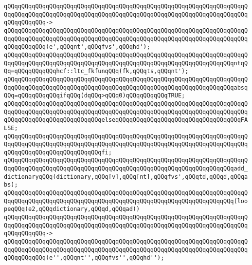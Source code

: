 \verb|qQQqqQQqqQQqqQQqqQQqqQQqqQQqqQQqqQQqqQQqqQQqqQQqqQQqqQQqqQQqqQQqqQQqqQQqqQQqqQQqqQQqqQQqqQQqqQQqqQQqqQQqqQQqqQQqqQQqqQQqqQQqqQQqqQQqqQQqqQQqqQQqqQQqqQQq->|\newline
\verb|qQQqqQQqqQQqqQQqqQQqqQQqqQQqqQQqqQQqqQQqqQQqqQQqqQQqqQQqqQQqqQQqqQQqqQQqqQQqqQQqqQQqqQQqqQQqqQQqqQQqqQQqqQQqqQQqqQQqqQQqqQQqqQQqqQQqqQQqqQQqqQQqqQQqqQQq(e',qQQqnt',qQQqfvs',qQQqhd');|\newline
\newline
\verb|qQQqqQQqqQQqqQQqqQQqqQQqqQQqqQQqqQQqqQQqqQQqqQQqqQQqqQQqqQQqqQQqqQQqqQQqqQQqqQQqqQQqqQQqqQQqqQQqqQQqqQQqqQQqqQQqqQQqqQQqqQQqqQQqqQQqqQQqntqQQq=qQQqqQQqqQQqhcf::ltc_fkfunqQQq(fk,qQQqts,qQQqnt');|\newline
\newline
\verb|qQQqqQQqqQQqqQQqqQQqqQQqqQQqqQQqqQQqqQQqqQQqqQQqqQQqqQQqqQQqqQQqqQQqqQQqqQQqqQQqqQQqqQQqqQQqqQQqqQQqqQQqqQQqqQQqqQQqqQQqqQQqqQQqqQQqqQQqabsqQQq=qQQqqQQqqQQqifqQQq(dqQQq>qQQq0)qQQqqQQqqQQqTRUE;|\newline
\verb|qQQqqQQqqQQqqQQqqQQqqQQqqQQqqQQqqQQqqQQqqQQqqQQqqQQqqQQqqQQqqQQqqQQqqQQqqQQqqQQqqQQqqQQqqQQqqQQqqQQqqQQqqQQqqQQqqQQqqQQqqQQqqQQqqQQqqQQqqQQqqQQqqQQqqQQqqQQqqQQqqQQqqQQqelseqQQqqQQqqQQqqQQqqQQqqQQqqQQqqQQqqQQqFALSE;|\newline
\verb|qQQqqQQqqQQqqQQqqQQqqQQqqQQqqQQqqQQqqQQqqQQqqQQqqQQqqQQqqQQqqQQqqQQqqQQqqQQqqQQqqQQqqQQqqQQqqQQqqQQqqQQqqQQqqQQqqQQqqQQqqQQqqQQqqQQqqQQqqQQqqQQqqQQqqQQqqQQqqQQqqQQqqQQqfi;|\newline
\newline
\verb|qQQqqQQqqQQqqQQqqQQqqQQqqQQqqQQqqQQqqQQqqQQqqQQqqQQqqQQqqQQqqQQqqQQqqQQqqQQqqQQqqQQqqQQqqQQqqQQqqQQqqQQqqQQqqQQqqQQqqQQqqQQqqQQqqQQqqQQqadd_dictionaryqQQq(dictionary,qQQq[v],qQQq[nt],qQQqfvs',qQQqtd,qQQqd,qQQqabs);|\newline
\newline
\verb|qQQqqQQqqQQqqQQqqQQqqQQqqQQqqQQqqQQqqQQqqQQqqQQqqQQqqQQqqQQqqQQqqQQqqQQqqQQqqQQqqQQqqQQqqQQqqQQqqQQqqQQqqQQqqQQqqQQqqQQqqQQqqQQqqQQqqQQq(loopeqQQq(e2,qQQqdictionary,qQQqd,qQQqad))|\newline
\verb|qQQqqQQqqQQqqQQqqQQqqQQqqQQqqQQqqQQqqQQqqQQqqQQqqQQqqQQqqQQqqQQqqQQqqQQqqQQqqQQqqQQqqQQqqQQqqQQqqQQqqQQqqQQqqQQqqQQqqQQqqQQqqQQqqQQqqQQqqQQqqQQqqQQqqQQq->|\newline
\verb|qQQqqQQqqQQqqQQqqQQqqQQqqQQqqQQqqQQqqQQqqQQqqQQqqQQqqQQqqQQqqQQqqQQqqQQqqQQqqQQqqQQqqQQqqQQqqQQqqQQqqQQqqQQqqQQqqQQqqQQqqQQqqQQqqQQqqQQqqQQqqQQqqQQqqQQq(e'',qQQqnt'',qQQqfvs'',qQQqhd'');|\newline
\newline
